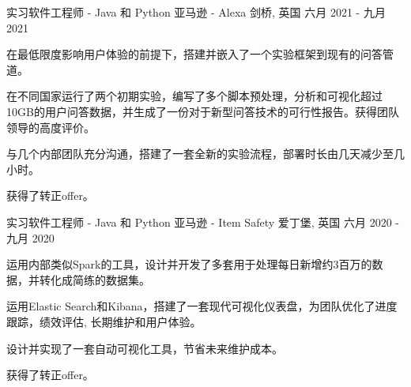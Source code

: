 

\begin{cventries}




  \cventry
    {实习软件工程师 - Java 和 Python} %
    {亚马逊 - Alexa} %
    {剑桥, 英国} %
    {六月 2021 - 九月 2021} %
    {
      \begin{cvitems} %
        \item {在最低限度影响用户体验的前提下，搭建并嵌入了一个实验框架到现有的问答管道。}
        \item {在不同国家运行了两个初期实验，编写了多个脚本预处理，分析和可视化超过10GB的用户问答数据，并生成了一份对于新型问答技术的可行性报告。获得团队领导的高度评价。}
        \item {与几个内部团队充分沟通，搭建了一套全新的实验流程，部署时长由几天减少至几小时。}
        \item {获得了转正offer。}
      \end{cvitems}
    }

  \cventry
    {实习软件工程师 - Java 和 Python} %
    {亚马逊 - Item Safety} %
    {爱丁堡, 英国} %
    {六月 2020 - 九月 2020} %
    {
      \begin{cvitems} %
        \item {运用内部类似Spark的工具，设计并开发了多套用于处理每日新增约3百万的数据，并转化成简练的数据集。}
        \item {运用Elastic Search和Kibana，搭建了一套现代可视化仪表盘，为团队优化了进度跟踪，绩效评估, 长期维护和用户体验。}
        \item {设计并实现了一套自动可视化工具，节省未来维护成本。}
        \item {获得了转正offer。}
      \end{cvitems}
    }

  
\end{cventries}
